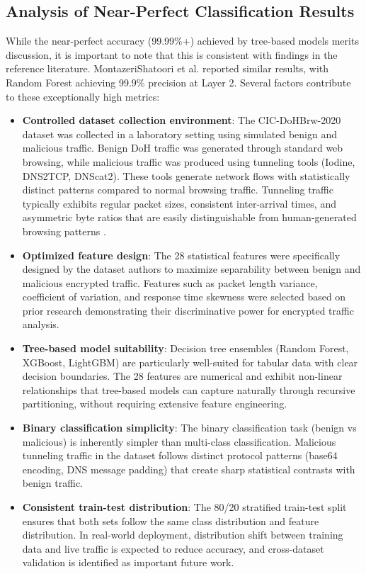 \documentclass[../Main.tex]{subfiles}
\begin{document}
\subsection{Analysis of Near-Perfect Classification Results}
\label{section:4.6.6b}

While the near-perfect accuracy (99.99\%+) achieved by tree-based models merits discussion, it is important to note that this is consistent with findings in the reference literature. MontazeriShatoori et al. \cite{montazeri2020doh} reported similar results, with Random Forest achieving 99.9\% precision at Layer 2. Several factors contribute to these exceptionally high metrics:

\begin{itemize}
    \item \textbf{Controlled dataset collection environment}: The CIC-DoHBrw-2020 dataset was collected in a laboratory setting using simulated benign and malicious traffic. Benign DoH traffic was generated through standard web browsing, while malicious traffic was produced using tunneling tools (Iodine, DNS2TCP, DNScat2). These tools generate network flows with statistically distinct patterns compared to normal browsing traffic. Tunneling traffic typically exhibits regular packet sizes, consistent inter-arrival times, and asymmetric byte ratios that are easily distinguishable from human-generated browsing patterns \cite{montazeri2020doh}.
    \item \textbf{Optimized feature design}: The 28 statistical features were specifically designed by the dataset authors to maximize separability between benign and malicious encrypted traffic. Features such as packet length variance, coefficient of variation, and response time skewness were selected based on prior research demonstrating their discriminative power for encrypted traffic analysis.
    \item \textbf{Tree-based model suitability}: Decision tree ensembles (Random Forest, XGBoost, LightGBM) are particularly well-suited for tabular data with clear decision boundaries. The 28 features are numerical and exhibit non-linear relationships that tree-based models can capture naturally through recursive partitioning, without requiring extensive feature engineering.
    \item \textbf{Binary classification simplicity}: The binary classification task (benign vs malicious) is inherently simpler than multi-class classification. Malicious tunneling traffic in the dataset follows distinct protocol patterns (base64 encoding, DNS message padding) that create sharp statistical contrasts with benign traffic.
    \item \textbf{Consistent train-test distribution}: The 80/20 stratified train-test split ensures that both sets follow the same class distribution and feature distribution. In real-world deployment, distribution shift between training data and live traffic is expected to reduce accuracy, and cross-dataset validation is identified as important future work.
\end{itemize}
\end{document}
